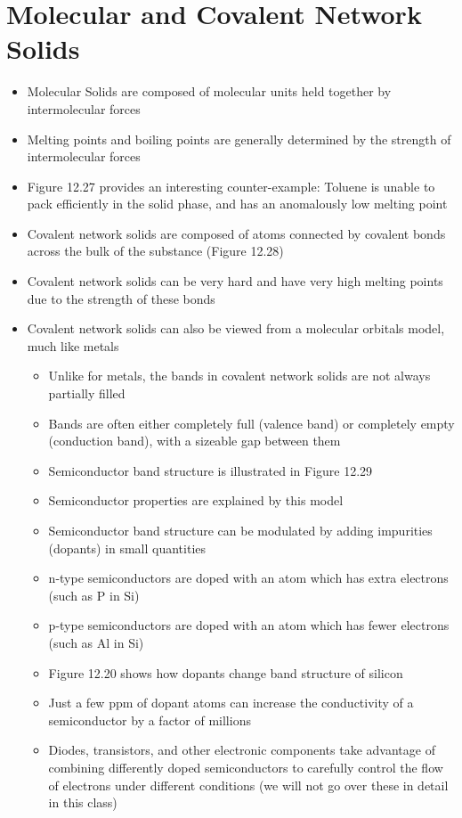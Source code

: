 \documentclass[12pt, openany, letterpaper]{memoir}
\begin{document}
\section{Molecular and Covalent Network Solids}
\begin{itemize}
  \item Molecular Solids are composed of molecular units held together by intermolecular forces
  \item Melting points and boiling points are generally determined by the strength of intermolecular forces
  \item Figure 12.27 provides an interesting counter-example: Toluene is unable to pack efficiently in the solid phase, and has an anomalously low melting point
  \item Covalent network solids are composed of atoms connected by covalent bonds across the bulk of the substance (Figure 12.28)
  \item Covalent network solids can be very hard and have very high melting points due to the strength of these bonds
  \item Covalent network solids can also be viewed from a molecular orbitals model, much like metals
  \begin{itemize}
    \item Unlike for metals, the bands in covalent network solids are not always partially filled
    \item Bands are often either completely full (valence band) or completely empty (conduction band), with a sizeable gap between them
    \item Semiconductor band structure is illustrated in Figure 12.29
    \item Semiconductor properties are explained by this model
    \item Semiconductor band structure can be modulated by adding impurities (dopants) in small quantities
    \item n-type semiconductors are doped with an atom which has extra electrons (such as P in Si)
    \item p-type semiconductors are doped with an atom which has fewer electrons (such as Al in Si)
    \item Figure 12.20 shows how dopants change band structure of silicon
    \item Just a few ppm of dopant atoms can increase the conductivity of a semiconductor by a factor of millions
    \item Diodes, transistors, and other electronic components take advantage of combining differently doped semiconductors to carefully control the flow of electrons under different conditions (we will not go over these in detail in this class)
  \end{itemize}
\end{itemize}
\end{document}
